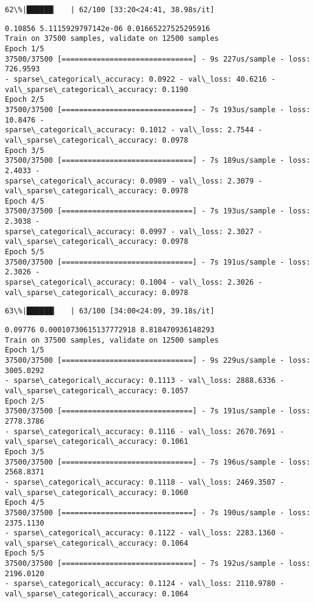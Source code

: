 \documentclass[11pt]{article}
\begin{document}
    \begin{Verbatim}[commandchars=\\\{\}]
 62\%|██████▏   | 62/100 [33:20<24:41, 38.98s/it]
    \end{Verbatim}

    \begin{Verbatim}[commandchars=\\\{\}]
0.10856 5.1115929797142e-06 0.01665227525295916
Train on 37500 samples, validate on 12500 samples
Epoch 1/5
37500/37500 [==============================] - 9s 227us/sample - loss: 726.9593
- sparse\_categorical\_accuracy: 0.0922 - val\_loss: 40.6216 -
val\_sparse\_categorical\_accuracy: 0.1190
Epoch 2/5
37500/37500 [==============================] - 7s 193us/sample - loss: 10.8476 -
sparse\_categorical\_accuracy: 0.1012 - val\_loss: 2.7544 -
val\_sparse\_categorical\_accuracy: 0.0978
Epoch 3/5
37500/37500 [==============================] - 7s 189us/sample - loss: 2.4033 -
sparse\_categorical\_accuracy: 0.0989 - val\_loss: 2.3079 -
val\_sparse\_categorical\_accuracy: 0.0978
Epoch 4/5
37500/37500 [==============================] - 7s 193us/sample - loss: 2.3038 -
sparse\_categorical\_accuracy: 0.0997 - val\_loss: 2.3027 -
val\_sparse\_categorical\_accuracy: 0.0978
Epoch 5/5
37500/37500 [==============================] - 7s 191us/sample - loss: 2.3026 -
sparse\_categorical\_accuracy: 0.1004 - val\_loss: 2.3026 -
val\_sparse\_categorical\_accuracy: 0.0978
    \end{Verbatim}

    \begin{Verbatim}[commandchars=\\\{\}]
 63\%|██████▎   | 63/100 [34:00<24:09, 39.18s/it]
    \end{Verbatim}

    \begin{Verbatim}[commandchars=\\\{\}]
0.09776 0.00010730615137772918 8.818470936148293
Train on 37500 samples, validate on 12500 samples
Epoch 1/5
37500/37500 [==============================] - 9s 229us/sample - loss: 3005.0292
- sparse\_categorical\_accuracy: 0.1113 - val\_loss: 2888.6336 -
val\_sparse\_categorical\_accuracy: 0.1057
Epoch 2/5
37500/37500 [==============================] - 7s 191us/sample - loss: 2778.3786
- sparse\_categorical\_accuracy: 0.1116 - val\_loss: 2670.7691 -
val\_sparse\_categorical\_accuracy: 0.1061
Epoch 3/5
37500/37500 [==============================] - 7s 196us/sample - loss: 2568.8371
- sparse\_categorical\_accuracy: 0.1118 - val\_loss: 2469.3507 -
val\_sparse\_categorical\_accuracy: 0.1060
Epoch 4/5
37500/37500 [==============================] - 7s 190us/sample - loss: 2375.1130
- sparse\_categorical\_accuracy: 0.1122 - val\_loss: 2283.1360 -
val\_sparse\_categorical\_accuracy: 0.1064
Epoch 5/5
37500/37500 [==============================] - 7s 192us/sample - loss: 2196.0120
- sparse\_categorical\_accuracy: 0.1124 - val\_loss: 2110.9780 -
val\_sparse\_categorical\_accuracy: 0.1064
    \end{Verbatim}
\end{document}
